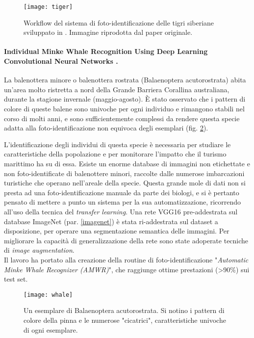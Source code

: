 \begin{figure}[h!]
\centering
\texttt{[image: tiger]}
\caption{Workflow del sistema di foto-identificazione delle tigri siberiane sviluppato in \cite{tiger}. Immagine riprodotta dal paper originale.}
\label{fig:tiger}
\end{figure}


\paragraph*{Individual Minke Whale Recognition Using
Deep Learning Convolutional Neural Networks \cite{whale}.}

La balenottera minore o balenottera rostrata (Balaenoptera acutorostrata) abita un'area molto ristretta a nord della Grande Barriera Corallina australiana, durante la stagione invernale (maggio-agosto). È stato osservato che i pattern di colore di queste balene sono univoche per ogni individuo e rimangono stabili nel corso di molti anni, e sono sufficientemente complessi da rendere questa specie adatta alla foto-identificazione non equivoca degli esemplari (fig. \ref{fig:whale}).

L'identificazione degli individui di questa specie è necessaria per studiare le caratteristiche della popolazione e per monitorare l'impatto che il turismo marittimo ha su di essa. Esiste un enorme database di immagini non etichettate e non foto-identificate di balenottere minori, raccolte dalle numerose imbarcazioni turistiche che operano nell'areale della specie. Questa grande mole di dati non si presta ad una foto-identificazione manuale da parte dei biologi, e si è pertanto pensato di mettere a punto un sistema per la sua automatizzazione, ricorrendo all'uso della tecnica del \textit{transfer learning}. Una rete VGG16 pre-addestrata sul database ImageNet (par. \ref{imagenet}) è stata ri-addestrata sul dataset a disposizione, per operare una segmentazione semantica delle immagini. Per migliorare la capacità di generalizzazione della rete sono state adoperate tecniche di \textit{image augmentation}.\\

Il lavoro ha portato alla creazione della routine di foto-identificazione "\textit{Automatic Minke Whale Recognizer (AMWR)}", che raggiunge ottime prestazioni (>90\%) sui test set.

\begin{figure}[h!]
\centering
\texttt{[image: whale]}
\caption{Un esemplare di Balaenoptera acutorostrata. Si notino i pattern di colore della pinna e le numerose "cicatrici", caratteristiche univoche di ogni esemplare.}
\label{fig:whale}
\end{figure}

